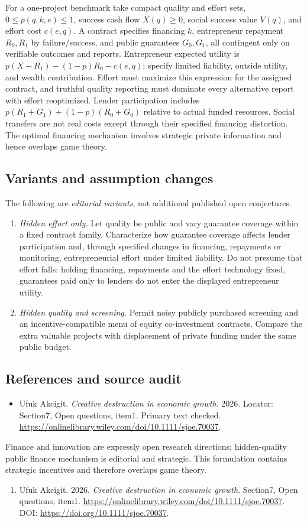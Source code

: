 \documentclass[11pt,a4paper]{article}
\begin{document}
For a one-project benchmark take compact quality and effort sets, \(0\le p(q,k,e)\le1\), success cash flow \(X(q)\ge0\), social success value \(V(q)\), and effort cost \(c(e,q)\). A contract specifies financing \(k\), entrepreneur repayment \(R_0,R_1\) by failure/success, and public guarantees \(G_0,G_1\), all contingent only on verifiable outcomes and reports. Entrepreneur expected utility is \(p(X-R_1)-(1-p)R_0-c(e,q)\); specify limited liability, outside utility, and wealth contribution. Effort must maximize this expression for the assigned contract, and truthful quality reporting must dominate every alternative report with effort reoptimized. Lender participation includes \(p(R_1+G_1)+(1-p)(R_0+G_0)\) relative to actual funded resources. Social transfers are not real costs except through their specified financing distortion. The optimal financing mechanism involves strategic private information and hence overlaps game theory.
\subsection*{Variants and assumption changes}
The following are \emph{editorial variants}, not additional published open conjectures.
\begin{enumerate}
\item \emph{Hidden effort only.} Let quality be public and vary guarantee coverage within a fixed contract family. Characterize how guarantee coverage affects lender participation and, through specified changes in financing, repayments or monitoring, entrepreneurial effort under limited liability. Do not presume that effort falls: holding financing, repayments and the effort technology fixed, guarantees paid only to lenders do not enter the displayed entrepreneur utility.
\item \emph{Hidden quality and screening.} Permit noisy publicly purchased screening and an incentive-compatible menu of equity co-investment contracts. Compare the extra valuable projects with displacement of private funding under the same public budget.
\end{enumerate}
\subsection*{References and source audit}
\begin{itemize}
\item Ufuk Akcigit. \emph{Creative destruction in economic growth}. 2026. Locator: Section7, Open questions, item1. Primary text checked. \url{https://onlinelibrary.wiley.com/doi/10.1111/sjoe.70037}.
\end{itemize}
Finance and innovation are expressly open research directions; hidden-quality public finance mechanism is editorial and strategic. This formulation contains strategic incentives and therefore overlaps game theory.
\begin{enumerate}\raggedright
\item\hypertarget{definitions:source:30007548:1}{} Ufuk Akcigit. 2026. \emph{Creative destruction in economic growth}. Section7, Open questions, item1.
\url{https://onlinelibrary.wiley.com/doi/10.1111/sjoe.70037}.
DOI: \url{https://doi.org/10.1111/sjoe.70037}.
\end{enumerate}
\end{document}

